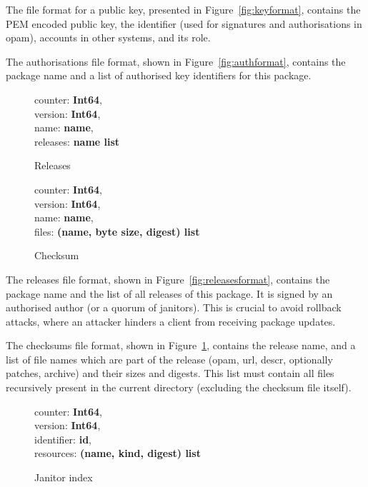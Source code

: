 \documentclass[nocopyrightspace]{sigplanconf}
\begin{document}
The file format for a public key, presented in Figure~\ref{fig:keyformat}, contains the PEM encoded public key, the identifier (used for signatures and authorisations in opam), accounts in other systems, and its role.

The authorisations file format, shown in Figure~\ref{fig:authformat}, contains the package name and a list of authorised key identifiers for this package.

\begin{figure}
  \centering
  \begin{minipage}{\hsize}
    \begin{minipage}{.3 \hsize}
counter: \textbf{Int64},\\
version: \textbf{Int64},\\
name: \textbf{name},\\
releases: \textbf{name list}
 \caption{\label{fig:releasesformat} Releases}
    \end{minipage}
    \begin{minipage}{.55 \hsize}
counter: \textbf{Int64},\\
version: \textbf{Int64},\\
name: \textbf{name},\\
files: \textbf{(name, byte size, digest) list}
 \caption{\label{fig:checksumformat} Checksum}
    \end{minipage}
  \end{minipage}
\end{figure}

The releases file format, shown in Figure~\ref{fig:releasesformat}, contains the package name and the list of all releases of this package.
It is signed by an authorised author (or a quorum of janitors).
This is crucial to avoid rollback attacks, where an attacker hinders a client from receiving package updates.

The checksums file format, shown in Figure~\ref{fig:checksumformat}, contains the release name, and a list of file names which are part of the release (opam, url, descr, optionally patches, archive) and their sizes and digests.
This list must contain all files recursively present in the current directory (excluding the checksum file itself).

\begin{figure}
  \centering
counter: \textbf{Int64},\\
version: \textbf{Int64},\\
identifier: \textbf{id},\\
resources: \textbf{(name, kind, digest) list}
 \caption{\label{fig:janindexformat} Janitor index}
\end{figure}
\end{document}

